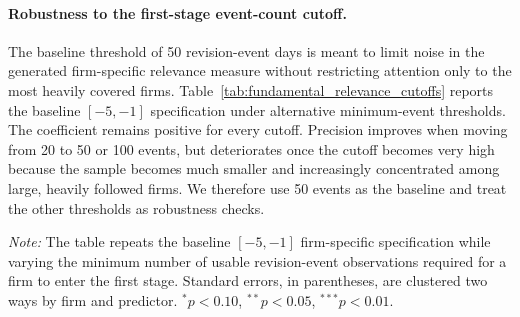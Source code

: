 \paragraph{Robustness to the first-stage event-count cutoff.}

The baseline threshold of 50 revision-event days is meant to limit noise in the generated firm-specific relevance measure without restricting attention only to the most heavily covered firms. Table~\ref{tab:fundamental_relevance_cutoffs} reports the baseline $[-5,-1]$ specification under alternative minimum-event thresholds. The coefficient remains positive for every cutoff. Precision improves when moving from 20 to 50 or 100 events, but deteriorates once the cutoff becomes very high because the sample becomes much smaller and increasingly concentrated among large, heavily followed firms. We therefore use 50 events as the baseline and treat the other thresholds as robustness checks.

\begin{table}[H]
\centering
\caption{Robustness to Minimum Revision-Event Cutoff}
\label{tab:fundamental_relevance_cutoffs}

\vspace{0.15cm}
\begin{minipage}{0.95\textwidth}
\footnotesize
\textit{Note:} The table repeats the baseline $[-5,-1]$ firm-specific specification while varying the minimum number of usable revision-event observations required for a firm to enter the first stage. Standard errors, in parentheses, are clustered two ways by firm and predictor. $^{*}p<0.10$, $^{**}p<0.05$, $^{***}p<0.01$.
\end{minipage}
\end{table}

